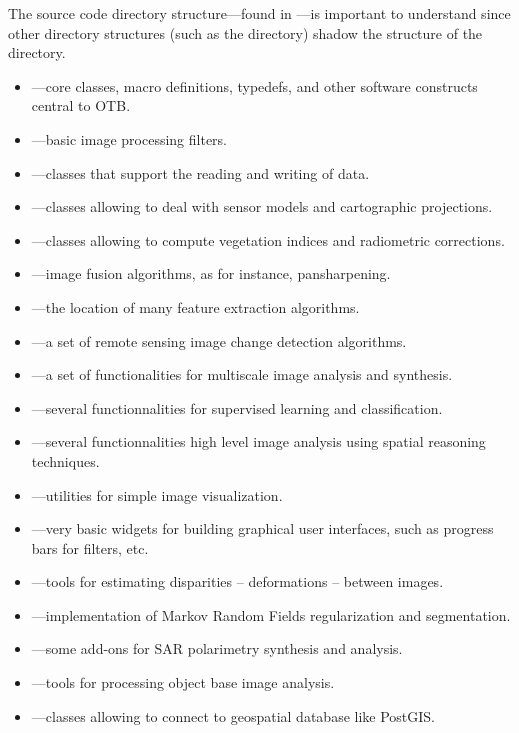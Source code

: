 The source code directory structure---found in ---is
important to understand since other directory structures (such as the
 directory) shadow the structure of the
 directory.
\begin{itemize}
        \item {}---core classes, macro definitions,
        typedefs, and other software constructs central to OTB.
        \item {}---basic image processing
        filters.
        \item {}---classes that support the reading
        and writing of data.
        \item {}---classes allowing
	to deal with sensor models and cartographic projections.
      \item {}---classes allowing to compute
      vegetation indices and radiometric corrections.
    \item {}---image fusion algorithms, as for
    instance, pansharpening.
	\item {}---the location of many
	feature extraction algorithms.
	\item {}---a set of remote
	sensing image change detection algorithms.
	\item {}---a set of functionalities
	for multiscale image analysis and synthesis.
	\item {}---several functionnalities for
	supervised learning and classification.
	\item {}---several
	functionnalities high level image analysis using spatial
	reasoning techniques.
	\item {}---utilities for simple image
	visualization.
	\item {}---very basic widgets for building
	graphical user interfaces, such as progress bars for filters,
	etc.
	\item {}---tools for estimating
	  disparities -- deformations -- between images.
	\item {}---implementation of Markov Random
	  Fields regularization and segmentation.
	\item {}---some add-ons for SAR
	polarimetry synthesis and analysis. 
	\item {}---tools for processing object base image 
        analysis.
        \item {}---classes allowing to connect to geospatial
        database like PostGIS. 

\end{itemize}

